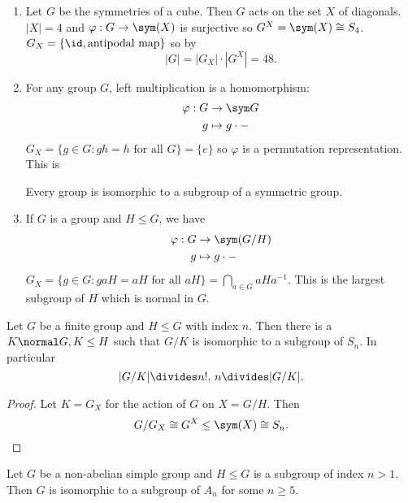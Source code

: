 \documentclass[a4paper]{article}
\theoremstyle{definition}
\begin{document}
\begin{eg}\leavevmode
  \begin{enumerate}
  \item Let \(G\) be the symmetries of a cube. Then \(G\) acts on the set \(X\) of diagonals. \(|X| = 4\) and \(\varphi: G \to \sym(X)\) is surjective so \(G^X = \sym(X) \cong S_4\). \(G_X = \{\id, \text{antipodal map}\}\) so by 
    \[
      |G| = |G_X| \cdot |G^X| = 48.
    \]
  \item For any group \(G\), left multiplication is a homomorphism:
    \begin{align*}
      \varphi: G &\to \sym G \\
      g &\mapsto g \cdot -
    \end{align*}
    \(G_X = \{g \in G: gh = h \text{ for all } G\} = \{e\}\) so \(\varphi\) is a permutation representation. This is

    \begin{theorem}[Cayley's]
      Every group is isomorphic to a subgroup of a symmetric group.
    \end{theorem}
  \item If \(G\) is a group and \(H \leq G\), we have
    \begin{align*}
      \varphi: G &\to \sym(G/H) \\
      g &\mapsto g \cdot -
    \end{align*}
    \(G_X = \{g \in G: gaH = aH \text{ for all } aH\} = \bigcap_{a \in G} aHa^{-1}\). This is the largest subgroup of \(H\) which is normal in \(G\).
  \end{enumerate}
\end{eg}

\begin{theorem}
  Let \(G\) be a finite group and \(H \leq G\) with index \(n\). Then there is a \(K \normal G, K \leq H\) such that \(G/K\) is isomorphic to a subgroup of \(S_n\). In particular
  \[
    |G/K| \divides n!, \, n \divides |G/K|.
  \]
\end{theorem}

\begin{proof}
  Let \(K = G_X\) for the action of \(G\) on \(X = G/H\). Then
  \[
    G/G_X \cong G^X \leq \sym(X) \cong S_n.
  \]
\end{proof}

\begin{theorem}
  \label{thm:non-abelian simple group}
  Let \(G\) be a non-abelian simple group and \(H \leq G\) is a subgroup of index \(n > 1\). Then \(G\) is isomorphic to a subgroup of \(A_n\) for some \(n \geq 5\).
\end{theorem}
\end{document}
